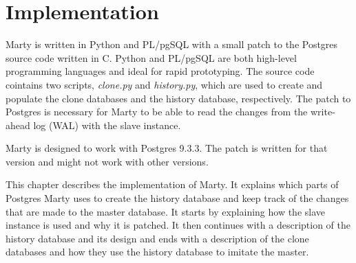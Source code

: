 \chapter{Implementation}
Marty is written in Python and PL/pgSQL with a small patch to the Postgres source code written in C.
Python and PL/pgSQL are both high-level programming languages and ideal for rapid prototyping.
The source code cointains two scripts, \textit{clone.py} and \textit{history.py}, which are used to create and populate the clone databases and the history database, respectively.
The patch to Postgres is necessary for Marty to be able to read the changes from the write-ahead log (WAL) with the slave instance.

Marty is designed to work with Postgres 9.3.3.
The patch is written for that version and might not work with other versions.

This chapter describes the implementation of Marty.
It explains which parts of Postgres Marty uses to create the history database and keep track of the changes that are made to the master database.
It starts by explaining how the slave instance is used and why it is patched.
It then continues with a description of the history database and its design and ends with a description of the clone databases and how they use the history database to imitate the master.


